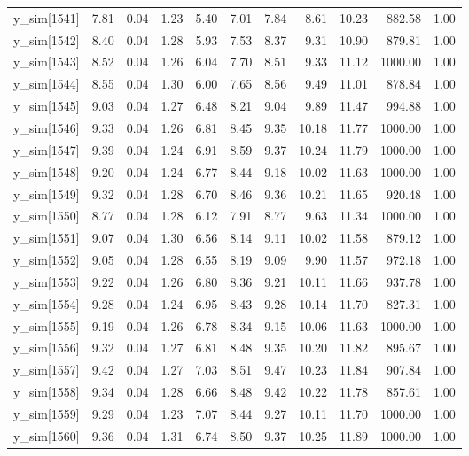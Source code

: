 \begin{table}[ht]
\begin{tabular}{rrrrrrrrrrr}
  y\_sim[1541] & 7.81 & 0.04 & 1.23 & 5.40 & 7.01 & 7.84 & 8.61 & 10.23 & 882.58 & 1.00 \\ 
  y\_sim[1542] & 8.40 & 0.04 & 1.28 & 5.93 & 7.53 & 8.37 & 9.31 & 10.90 & 879.81 & 1.00 \\ 
  y\_sim[1543] & 8.52 & 0.04 & 1.26 & 6.04 & 7.70 & 8.51 & 9.33 & 11.12 & 1000.00 & 1.00 \\ 
  y\_sim[1544] & 8.55 & 0.04 & 1.30 & 6.00 & 7.65 & 8.56 & 9.49 & 11.01 & 878.84 & 1.00 \\ 
  y\_sim[1545] & 9.03 & 0.04 & 1.27 & 6.48 & 8.21 & 9.04 & 9.89 & 11.47 & 994.88 & 1.00 \\ 
  y\_sim[1546] & 9.33 & 0.04 & 1.26 & 6.81 & 8.45 & 9.35 & 10.18 & 11.77 & 1000.00 & 1.00 \\ 
  y\_sim[1547] & 9.39 & 0.04 & 1.24 & 6.91 & 8.59 & 9.37 & 10.24 & 11.79 & 1000.00 & 1.00 \\ 
  y\_sim[1548] & 9.20 & 0.04 & 1.24 & 6.77 & 8.44 & 9.18 & 10.02 & 11.63 & 1000.00 & 1.00 \\ 
  y\_sim[1549] & 9.32 & 0.04 & 1.28 & 6.70 & 8.46 & 9.36 & 10.21 & 11.65 & 920.48 & 1.00 \\ 
  y\_sim[1550] & 8.77 & 0.04 & 1.28 & 6.12 & 7.91 & 8.77 & 9.63 & 11.34 & 1000.00 & 1.00 \\ 
  y\_sim[1551] & 9.07 & 0.04 & 1.30 & 6.56 & 8.14 & 9.11 & 10.02 & 11.58 & 879.12 & 1.00 \\ 
  y\_sim[1552] & 9.05 & 0.04 & 1.28 & 6.55 & 8.19 & 9.09 & 9.90 & 11.57 & 972.18 & 1.00 \\ 
  y\_sim[1553] & 9.22 & 0.04 & 1.26 & 6.80 & 8.36 & 9.21 & 10.11 & 11.66 & 937.78 & 1.00 \\ 
  y\_sim[1554] & 9.28 & 0.04 & 1.24 & 6.95 & 8.43 & 9.28 & 10.14 & 11.70 & 827.31 & 1.00 \\ 
  y\_sim[1555] & 9.19 & 0.04 & 1.26 & 6.78 & 8.34 & 9.15 & 10.06 & 11.63 & 1000.00 & 1.00 \\ 
  y\_sim[1556] & 9.32 & 0.04 & 1.27 & 6.81 & 8.48 & 9.35 & 10.20 & 11.82 & 895.67 & 1.00 \\ 
  y\_sim[1557] & 9.42 & 0.04 & 1.27 & 7.03 & 8.51 & 9.47 & 10.23 & 11.84 & 907.84 & 1.00 \\ 
  y\_sim[1558] & 9.34 & 0.04 & 1.28 & 6.66 & 8.48 & 9.42 & 10.22 & 11.78 & 857.61 & 1.00 \\ 
  y\_sim[1559] & 9.29 & 0.04 & 1.23 & 7.07 & 8.44 & 9.27 & 10.11 & 11.70 & 1000.00 & 1.00 \\ 
  y\_sim[1560] & 9.36 & 0.04 & 1.31 & 6.74 & 8.50 & 9.37 & 10.25 & 11.89 & 1000.00 & 1.00 \\ 

\end{tabular}
\end{table}
